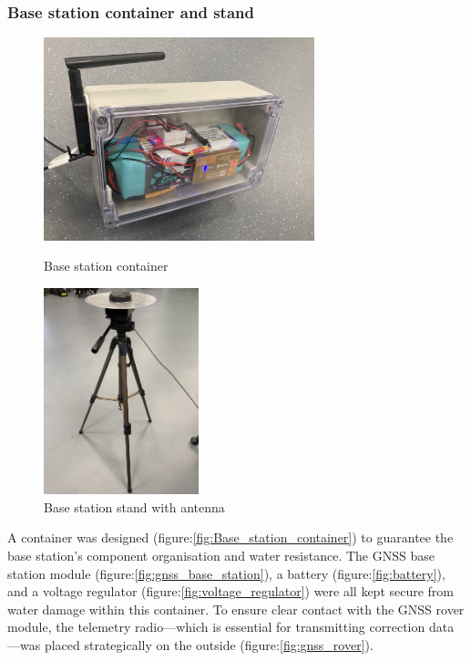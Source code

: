 \documentclass{article}
\begin{document}
\subsubsection{Base station container and stand}
\begin{figure}[H]
  \begin{minipage}{.5\textwidth}
    \centering
    \includegraphics[width=0.7\textwidth]{Pictures/base_station_box.png}
    \caption{Base station container}
    \label{fig:Base_station_container}
  \end{minipage}
  \begin{minipage}{.5\textwidth}
    \centering
    \includegraphics[width=0.4\textwidth]{Pictures/base_station_stand.jpg}
    \caption{Base station stand with antenna}
    \label{fig:Base_station_stand}
  \end{minipage}
\end{figure}
A container was designed (figure:\ref{fig:Base_station_container}) to guarantee the base station's component organisation and water resistance. The GNSS base station module (figure:\ref{fig:gnss_base_station}), a battery (figure:\ref{fig:battery}), and a voltage regulator (figure:\ref{fig:voltage_regulator}) were all kept secure from water damage within this container. To ensure clear contact with the GNSS 
rover module, the telemetry radio—which is essential for transmitting correction data—was placed strategically on the outside (figure:\ref{fig:gnss_rover}).
\end{document}

